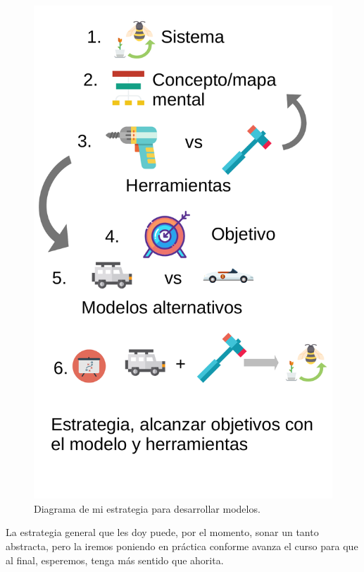 \documentclass[
]{book}
\begin{document}
\begin{figure}

{\centering \includegraphics[width=8.5in]{Unidad-I/Diagrama-dearrollo} 

}

\caption{ Diagrama de mi estrategia para desarrollar modelos.}\label{fig:unnamed-chunk-31}
\end{figure}

La estrategia general que les doy puede, por el momento, sonar un tanto abstracta, pero la iremos poniendo en práctica conforme avanza el curso para que al final, esperemos, tenga más sentido que ahorita.
\end{document}
